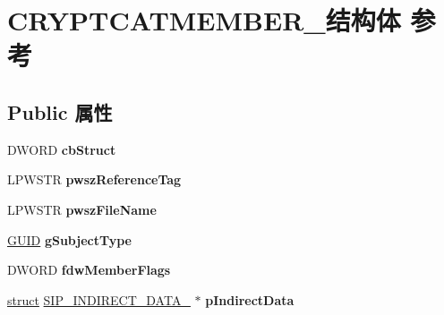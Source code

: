 \hypertarget{struct_c_r_y_p_t_c_a_t_m_e_m_b_e_r__}{}\section{C\+R\+Y\+P\+T\+C\+A\+T\+M\+E\+M\+B\+E\+R\+\_\+结构体 参考}
\label{struct_c_r_y_p_t_c_a_t_m_e_m_b_e_r__}
\subsection*{Public 属性}
\begin{DoxyCompactItemize}
\item 
\mbox{\label{struct_c_r_y_p_t_c_a_t_m_e_m_b_e_r___aa4dad7f86c66cf47584babe15710e929}} 
D\+W\+O\+RD {\bfseries cb\+Struct}
\item 
\mbox{\label{struct_c_r_y_p_t_c_a_t_m_e_m_b_e_r___ae256e8688ca4bfc9bff30e384cb400ef}} 
L\+P\+W\+S\+TR {\bfseries pwsz\+Reference\+Tag}
\item 
\mbox{\label{struct_c_r_y_p_t_c_a_t_m_e_m_b_e_r___add60224c454383eff66b74848e63a7d8}} 
L\+P\+W\+S\+TR {\bfseries pwsz\+File\+Name}
\item 
\mbox{\label{struct_c_r_y_p_t_c_a_t_m_e_m_b_e_r___a7f6d502263515242b22d480ee0c70e42}} 
\hyperlink{interface_g_u_i_d}{G\+U\+ID} {\bfseries g\+Subject\+Type}
\item 
\mbox{\label{struct_c_r_y_p_t_c_a_t_m_e_m_b_e_r___acd3652b909ec249eabddc89c745b5d65}} 
D\+W\+O\+RD {\bfseries fdw\+Member\+Flags}
\item 
\mbox{\label{struct_c_r_y_p_t_c_a_t_m_e_m_b_e_r___a74341873eedc62252f6e29f8a87c5e29}} 
\hyperlink{interfacestruct}{struct} \hyperlink{struct_s_i_p___i_n_d_i_r_e_c_t___d_a_t_a__}{S\+I\+P\+\_\+\+I\+N\+D\+I\+R\+E\+C\+T\+\_\+\+D\+A\+T\+A\+\_\+} $\ast$ {\bfseries p\+Indirect\+Data}
\item 
\mbox{\label{struct_c_r_y_p_t_c_a_t_m_e_m_b_e_r___ab67417a80bc05ac404fb1f1dfe8ab548}} 

\end{DoxyCompactItemize}
